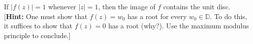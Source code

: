 If $|f(z)| = 1$ whenever $|z| = 1$, then the image of $f$ contains the unit disc.
\ \\

[\textbf{Hint:} One must show that $f(z) = w_0$ has a root for every $w_0 \in \mathbb{D}$. To do this, it suffices to
show that $f(z) = 0$ has a root (why?). Use the maximum modulus principle to conclude.]

\begin{solution}
  \ \\
\end{solution}